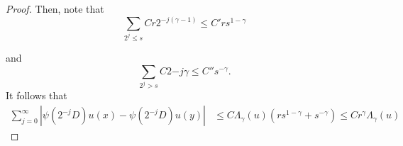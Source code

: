 \documentclass[12pt]{scrartcl}
\newcommand{\<}{\langle}
\renewcommand{\>}{\rangle}
\begin{document}
\begin{proof}
Then, note that 
$$ \sum_{2^j \le s} Cr2^{-j(\gamma - 1)} \le C' r  s^{1-\gamma}$$

and 
$$\sum_{2^j > s} C2{-j\gamma} \le C'' s^{-\gamma}.$$
It follows that 
\begin{align*}
\sum_{j=0}^\infty |\psi(2^{-j}D)u(x) - \psi(2^{-j}D)u(y)| &\le C\Lambda_\gamma(u)(rs^{1 - \gamma} + s^{-\gamma}) \le Cr^\gamma\Lambda_\gamma(u) 
\end{align*}
\end{proof}
 
\end{document}

